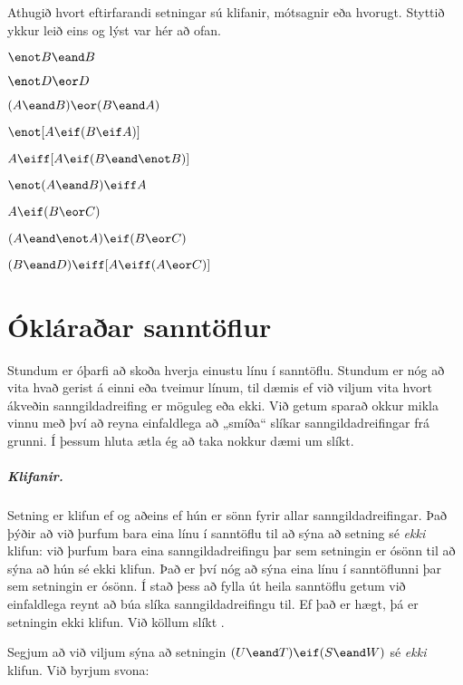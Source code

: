 \practiceproblems
\problempart
Athugið hvort eftirfarandi setningar sú klifanir, mótsagnir eða hvorugt. Styttið ykkur leið eins og lýst var hér að ofan.

\begin{earg}
	\item $\enot B \eand B$ %
	\item $\enot D \eor D$ %
	\item $(A\eand B) \eor (B\eand A)$ %
	\item $\enot[A \eif (B \eif A)]$ %
	\item $A \eiff [A \eif (B \eand \enot B)]$ %
	\item $\enot(A\eand B) \eiff A$ %
	\item $A\eif(B\eor C)$ %
	\item $(A \eand\enot A) \eif (B \eor C)$ %
	\item $(B\eand D) \eiff [A \eiff(A \eor C)]$%
\end{earg}


\chapter{Ókláraðar sanntöflur}\label{s:PartialTruthTable}

Stundum er óþarfi að skoða hverja einustu línu í sanntöflu. Stundum er nóg að vita hvað gerist á einni eða tveimur línum, til dæmis ef við viljum vita hvort ákveðin sanngildadreifing er möguleg eða ekki. Við getum sparað okkur mikla vinnu með því að reyna einfaldlega að „smíða“ slíkar sanngildadreifingar frá grunni. Í þessum hluta ætla ég að taka nokkur dæmi um slíkt.

\paragraph{Klifanir.}

Setning er klifun ef og aðeins ef hún er sönn fyrir allar sanngildadreifingar. Það þýðir að við þurfum bara eina línu í sanntöflu til að sýna að setning sé \emph{ekki} klifun: við þurfum bara eina sanngildadreifingu þar sem setningin er ósönn til að sýna að hún sé ekki klifun. Það er því nóg að sýna eina línu í sanntöflunni þar sem setningin er ósönn. Í stað þess að fylla út heila sanntöflu getum við einfaldlega reynt að búa slíka sanngildadreifingu til. Ef það er hægt, þá er setningin ekki klifun. Við köllum slíkt .

Segjum að við viljum sýna að setningin $(U \eand T) \eif (S \eand W)$ sé \emph{ekki} klifun. Við byrjum svona:

